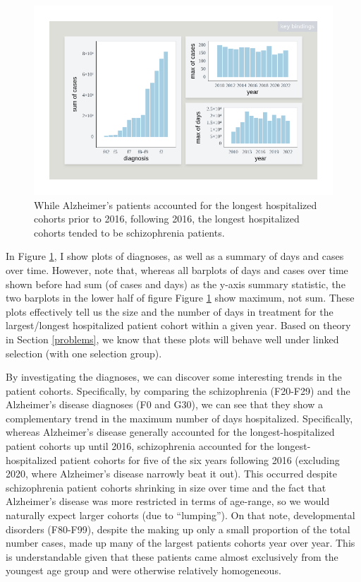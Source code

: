 \documentclass[
]{book}
\theoremstyle{definition}
\theoremstyle{definition}
\theoremstyle{definition}
\theoremstyle{definition}
\theoremstyle{remark}
\begin{document}
\begin{figure}

{\centering \includegraphics[width=1\linewidth,height=1\textheight]{./figures/example-cases-diagnosis-max} 

}

\caption{While Alzheimer's patients accounted for the longest hospitalized cohorts prior to 2016, following 2016, the longest hospitalized cohorts tended to be schizophrenia patients.}\label{fig:example-cases-diagnosis-max}
\end{figure}

In Figure \ref{fig:example-cases-diagnosis-max}, I show plots of diagnoses, as well as a summary of days and cases over time. However, note that, whereas all barplots of days and cases over time shown before had sum (of cases and days) as the y-axis summary statistic, the two barplots in the lower half of figure Figure \ref{fig:example-cases-diagnosis-max} show maximum, not sum. These plots effectively tell us the size and the number of days in treatment for the largest/longest hospitalized patient cohort within a given year. Based on theory in Section \ref{problems}, we know that these plots will behave well under linked selection (with one selection group).

By investigating the diagnoses, we can discover some interesting trends in the patient cohorts. Specifically, by comparing the schizophrenia (F20-F29) and the Alzheimer's disease diagnoses (F0 and G30), we can see that they show a complementary trend in the maximum number of days hospitalized. Specifically, whereas Alzheimer's disease generally accounted for the longest-hospitalized patient cohorts up until 2016, schizophrenia accounted for the longest-hospitalized patient cohorts for five of the six years following 2016 (excluding 2020, where Alzheimer's disease narrowly beat it out). This occurred despite schizophrenia patient cohorts shrinking in size over time and the fact that Alzheimer's disease was more restricted in terms of age-range, so we would naturally expect larger cohorts (due to ``lumping''). On that note, developmental disorders (F80-F99), despite the making up only a small proportion of the total number cases, made up many of the largest patients cohorts year over year. This is understandable given that these patients came almost exclusively from the youngest age group and were otherwise relatively homogeneous.
\end{document}
